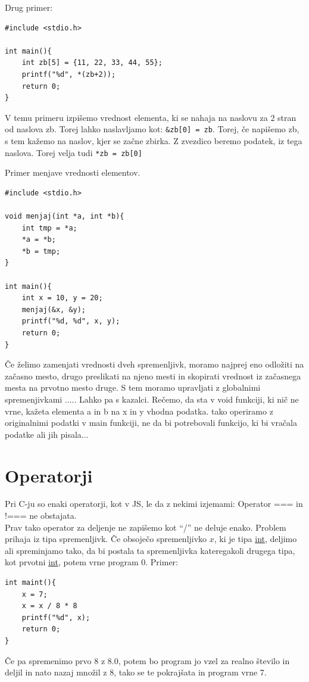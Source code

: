 \documentclass[a4paper, 12pt]{article}
\begin{document}
Drug primer:
\begin{lstlisting}
#include <stdio.h>

int main(){
	int zb[5] = {11, 22, 33, 44, 55};
	printf("%d", *(zb+2));
	return 0;
}
\end{lstlisting}

V temu primeru izpišemo vrednost elementa, ki se nahaja na naslovu za 2 stran od naslova zb. Torej lahko naslavljamo kot: \lstinline|&zb[0] = zb|. Torej, če napišemo zb, s tem kažemo na naslov, kjer se začne zbirka. Z zvezdico beremo podatek, iz tega naslova. Torej velja tudi \lstinline|*zb = zb[0]|\ 

\pagebreak

Primer menjave vrednosti elementov.
\begin{lstlisting}
#include <stdio.h>

void menjaj(int *a, int *b){
	int tmp = *a;
	*a = *b;
	*b = tmp;
}

int main(){
	int x = 10, y = 20;
	menjaj(&x, &y);
	printf("%d, %d", x, y);
	return 0;
}
\end{lstlisting}

Če želimo zamenjati vrednosti dveh spremenljivk, moramo najprej eno odložiti na začasno mesto, drugo preslikati na njeno mesti in skopirati vrednost iz začasnega mesta na prvotno mesto druge. S tem moramo upravljati z globalnimi spremenjivkami ..... Lahko pa s kazalci. Rečemo, da sta v void funkciji, ki nič ne vrne, kažeta elementa a in b na x in y vhodna podatka. tako operiramo z originalnimi podatki v main funkciji, ne da bi potrebovali funkcijo, ki bi vračala podatke ali jih pisala...



\section{Operatorji}
Pri C-ju so enaki operatorji, kot v JS, le da z nekimi izjemami: Operator === in !=== ne obstajata.\\
Prav tako operator za deljenje ne zapišemo kot ``/'' ne deluje enako. Problem prihaja iz tipa spremenljivk. Če obsoječo spremenljivko $x$, ki je tipa \underline{int}, deljimo ali spreminjamo tako, da bi postala ta spremenljivka kateregakoli drugega tipa, kot prvotni \underline{int}, potem vrne program 0. Primer:
\begin{lstlisting}
int maint(){	
	x = 7;
	x = x / 8 * 8
	printf("%d", x);
	return 0;
}
\end{lstlisting}
Če pa spremenimo prvo 8 z 8.0, potem bo program jo vzel za realno število in deljil in nato nazaj množil z 8, tako se te pokrajšata in program vrne 7.
\end{document}
